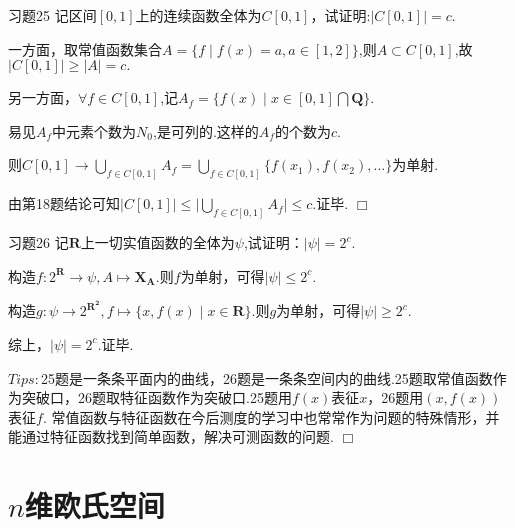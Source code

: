 \documentclass[11pt, a4paper, twoside]{ctexbook}
\newenvironment{proof2}{{\noindent\heiti 证明}}{\hfill $\Box $\par}
\begin{document}
	\begin{myproposition}{习题25}{}
		记区间$[0,1]$上的连续函数全体为$C[0,1]$，试证明:$\mid C[0,1]\mid =c$.	
	\end{myproposition}
	\begin{proof2}
		一方面，取常值函数集合$A=\{f\mid f(x)=a,a\in[1,2]\}$,则$A\subset C[0,1]$,故$\mid C[0,1]\mid \geq \mid A\mid =c.$
	

		另一方面，$\forall f\in C[0,1]$,记$A_{f}=\{f(x)\mid x\in [0,1]\bigcap \mathbf{Q}\}$.


		易见$A_{f}$中元素个数为$N_{0}$,是可列的.这样的$A_{f}$的个数为$c$.


		则$C[0,1]\to \displaystyle\bigcup_{f\in C[0,1]}A_{f}=\displaystyle\bigcup_{f\in C[0,1]}\{f(x_{1}),f(x_{2}),…\}$为单射.


		由第18题结论可知$\mid C[0,1]\mid \leq \mid \displaystyle\bigcup_{f\in C[0,1]}A_{f}\mid \leq c.$证毕.
	\end{proof2}


	\begin{myproposition}{习题26}{}
		记$\mathbf{R}$上一切实值函数的全体为$\psi $,试证明：$\mid \psi \mid=2^{c}$.	\end{myproposition}
	\begin{proof2}
		构造$f:2^{\mathbf{R}}\to \psi ,A\mapsto \mathbf{X_{A}}$.则$f$为单射，可得$\mid \psi \mid \leq 2^{c}$.


		构造$g:\psi\to 2^{\mathbf{R^{2}}}  ,f \mapsto \{x,f(x)\mid x \in \mathbf{R}\}$.则$g$为单射，可得$\mid \psi \mid \geq 2^{c}$.


		综上，$\mid \psi \mid=2^{c}$.证毕.


		$Tips:$25题是一条条平面内的曲线，26题是一条条空间内的曲线.25题取常值函数作为突破口，26题取特征函数作为突破口.25题用$f(x)$表征$x$，26题用$(x,f(x))$表征$f$.
		常值函数与特征函数在今后测度的学习中也常常作为问题的特殊情形，并能通过特征函数找到简单函数，解决可测函数的问题.
	\end{proof2}

    \section{$n$维欧氏空间}
\end{document}
